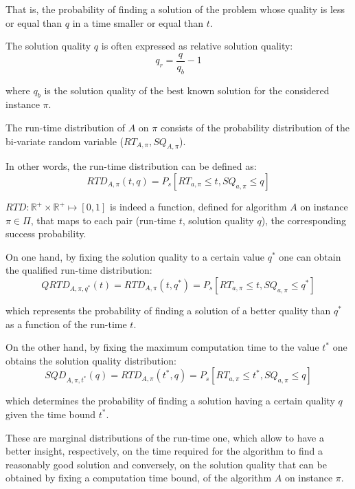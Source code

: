 That is, the probability of finding a solution of the problem whose quality is less or equal than $q$ in a time smaller or equal than $t$.

The solution quality $q$ is often expressed as relative solution quality:
\begin{equation}
  q_r = \frac{q}{q_b} - 1
\end{equation}

where $q_b$ is the solution quality of the best known solution for the considered instance $\pi$.

The run-time distribution of $A$ on $\pi$ consists of the probability distribution of the bi-variate random variable ($RT_{A,\pi},SQ_{A,\pi}$).

In other words, the run-time distribution can be defined as: 
\begin{equation}
  RTD_{A,\pi}(t,q) = P_s[RT_{a,\pi} \le t,SQ_{a,\pi} \le q]
\end{equation}

$RTD:\mathbb{R}^{+} \times \mathbb{R}^{+} \mapsto [0,1]$ is indeed a function, defined for algorithm $A$ on instance $\pi \in \Pi$, that maps to each pair (run-time $t$, solution quality $q$), the corresponding success probability.


On one hand, by fixing the solution quality to a certain value $q^{*}$ one can obtain the qualified run-time distribution:
\begin{equation}
  QRTD_{A,\pi,q^{*}}(t) = RTD_{A,\pi}(t,q^{*}) = P_s[RT_{a,\pi} \le t,SQ_{a,\pi} \le q^{*}]
\end{equation}

which represents the probability of finding a solution of a better quality than $q^{*}$ as a function of the run-time $t$.


On the other hand, by fixing the maximum computation time to the value $t^{*}$ one obtains the solution quality distribution:
\begin{equation}
  SQD_{A,\pi,t^{*}}(q) = RTD_{A,\pi}(t^{*},q) = P_s[RT_{a,\pi} \le t^{*},SQ_{a,\pi} \le q]
\end{equation}

which determines the probability of finding a solution having a certain quality $q$ given the time bound $t^{*}$.

These are marginal distributions of the run-time one, which allow to have a better insight, respectively, on the time required for the algorithm to find a reasonably good solution and conversely, on the solution quality that can be obtained by fixing a computation time bound, of the algorithm $A$ on instance $\pi$.

